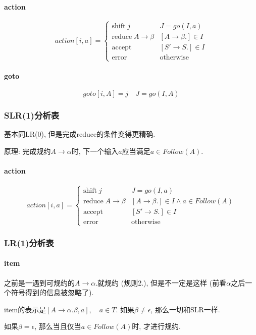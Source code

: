 \documentclass{ctexart}
\begin{document}
\paragraph{action} \[action[i, a] = \begin{cases}
    \text{shift}\; j          & J = go(I, a)\\
    \text{reduce}\; A\to\beta & [A \to \beta.] \in I\\
    \text{accept}             & [S' \to S.] \in I\\
    \text{error}              & \text{otherwise}
    \end{cases}\]
\paragraph{goto} \[goto[i, A] = j \quad J = go(I, A)\]

\subsubsection{SLR(1)分析表}
    基本同LR(0), 但是完成reduce的条件变得更精确.\par
    原理: 完成规约$A\to\alpha$时, 下一个输入$a$应当满足$a \in Follow(A)$.
\paragraph{action} \[action[i, a] = \begin{cases}
    \text{shift}\; j          & J = go(I, a)\\
    \text{reduce}\; A\to\beta & [A \to \beta.] \in I \land a \in Follow(A)\\
    \text{accept}             & [S' \to S.] \in I\\
    \text{error}              & \text{otherwise}
    \end{cases}\]

\subsubsection{LR(1)分析表}
\paragraph{item} 之前是一遇到可规约的$A \to \alpha.$就规约 (规则2.),
    但是不一定是这样 (前看$\alpha$之后一个符号得到的信息被忽略了).\par
    item的表示是$[A \to \alpha . \beta, a],\quad a \in T$. 如果$\beta \neq \epsilon$, 那么一切和SLR一样.\par
    如果$\beta = \epsilon$, 那么当且仅当$a \in Follow(A)$时, 才进行规约.
\end{document}
